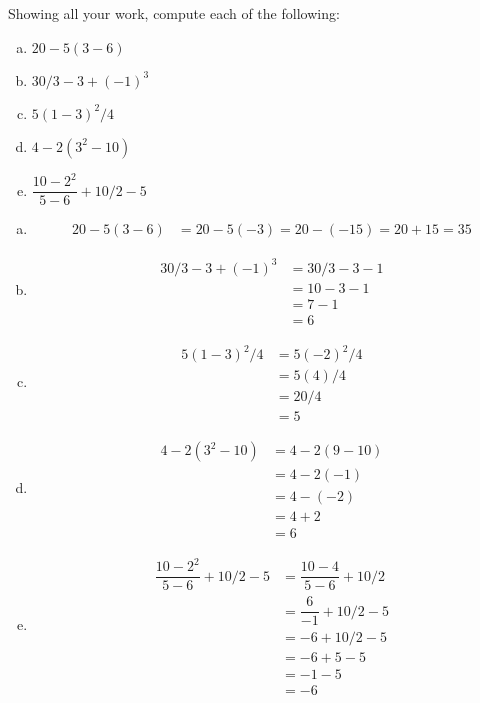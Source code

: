 \documentclass[11pt,letterpaper]{article}
\begin{document}

 Showing all your work, compute each of the following:
\begin{enumerate}[(a)]
\item $20 - 5(3 - 6)$ 
\item $30/3 - 3 + (-1)^3$
\item $5(1 - 3)^2/4$
\item $4 - 2(3^2 - 10)$
\item $\dfrac{10 - 2^2}{5 - 6} + 10/2 - 5$
\end{enumerate} 

\sol
\begin{enumerate}[(a)]
\item 
	\[
	\begin{aligned}
	20 - 5(3 - 6)&= 20 - 5(-3)= 20 - (-15)= 20 + 15= 35
	\end{aligned}
	\]

\item 
	\[
	\begin{aligned}
	30/3 - 3 + (-1)^3&= 30/3 - 3 - 1 \\
	&= 10 - 3 - 1 \\
	&= 7 - 1 \\
	&= 6
	\end{aligned}
	\]

\item 
	\[
	\begin{aligned}
	5(1 - 3)^2/4&= 5(-2)^2/4 \\
	&= 5(4)/4 \\
	&= 20/4 \\
	&= 5
	\end{aligned}
	\]

\item 
	\[
	\begin{aligned}
	4 - 2(3^2 - 10)&= 4 - 2(9 - 10) \\
	&= 4 - 2(-1) \\
	&= 4 - (-2) \\
	&= 4 + 2 \\
	&= 6
	\end{aligned}
	\]

\item 
	\[
	\begin{aligned}
	\dfrac{10 - 2^2}{5 - 6} + 10/2 - 5&= \dfrac{10 - 4}{5 - 6} + 10/2 \\
	&= \dfrac{6}{-1} + 10/2 - 5 \\
	&= -6 + 10/2 - 5 \\
	&= -6 + 5 - 5 \\
	&= -1 - 5 \\
	&= -6
	\end{aligned}
	\]
\end{enumerate}
\end{document}
